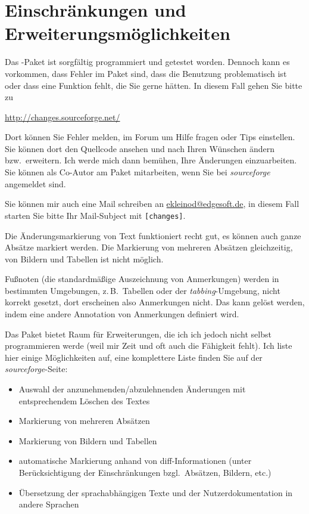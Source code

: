 \section{Einschränkungen und Erweiterungsmöglichkeiten}
\label{sec:limitations}

Das -Paket ist sorgfältig programmiert und getestet worden.
Dennoch kann es vorkommen, dass Fehler im Paket sind, dass die Benutzung problematisch ist oder dass eine Funktion fehlt, die Sie gerne hätten.
In diesem Fall gehen Sie bitte zu

\url{http://changes.sourceforge.net/}

Dort können Sie Fehler melden, im Forum um Hilfe fragen oder Tips einstellen.
Sie können dort den Quellcode ansehen und nach Ihren Wünschen ändern bzw.\ erweitern.
Ich werde mich dann bemühen, Ihre Änderungen einzuarbeiten.
Sie können als Co-Autor am Paket mitarbeiten, wenn Sie bei \emph{sourceforge} angemeldet sind.

Sie können mir auch eine Mail schreiben an \href{mailto:ekleinod@edgesoft.de}{ekleinod@edgesoft.de}, in diesem Fall starten Sie bitte Ihr Mail-Subject mit \texttt{[changes]}.

Die Änderungsmarkierung von Text funktioniert recht gut, es können auch ganze Absätze markiert werden.
Die Markierung von mehreren Absätzen gleichzeitig, von Bildern und Tabellen ist nicht möglich.

Fußnoten (die standardmäßige Auszeichnung von Anmerkungen) werden in bestimmten Umgebungen, z.\,B.\ Tabellen oder der \emph{tabbing}-Umgebung, nicht korrekt gesetzt, dort erscheinen also Anmerkungen nicht.
Das kann gelöst werden, indem eine andere Annotation von Anmerkungen definiert wird.

Das Paket bietet Raum für Erweiterungen, die ich ich jedoch nicht selbst programmieren werde (weil mir Zeit und oft auch die Fähigkeit fehlt).
Ich liste hier einige Möglichkeiten auf, eine komplettere Liste finden Sie auf der \emph{sourceforge}-Seite:
\begin{itemize}
	\item Auswahl der anzunehmenden/abzulehnenden Änderungen mit entsprechendem Löschen des Textes
	\item Markierung von mehreren Absätzen
	\item Markierung von Bildern und Tabellen
	\item automatische Markierung anhand von diff-Informationen (unter Berücksichtigung der Einschränkungen bzgl.\ Absätzen, Bildern, etc.)
	\item Übersetzung der sprachabhängigen Texte und der Nutzerdokumentation in andere Sprachen
\end{itemize}



